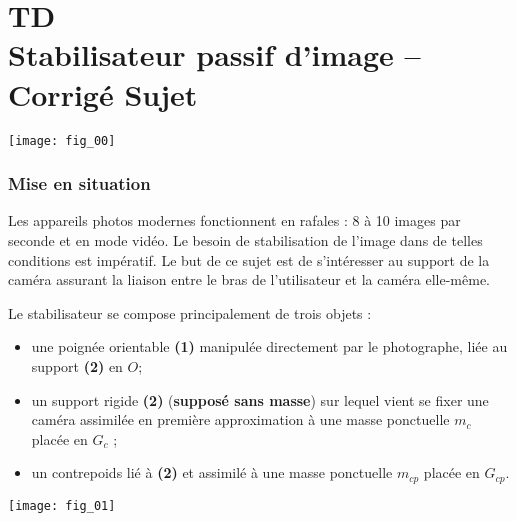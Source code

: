 \chapter*{TD  \\ 
Stabilisateur passif d'image -- \ifprof Corrigé \else Sujet \fi}

\iflivret {} \else
\ifprof  {} \else \fi
\fi

\setcounter{question}{0}
\begin{marginfigure}[4cm]
\centering
\texttt{[image: fig\_00]}
\end{marginfigure}




\subsection*{Mise en situation}
 \ifprof
 \else

Les appareils photos modernes fonctionnent en rafales : 8 à 10 images par seconde et en mode vidéo. Le besoin de
stabilisation de l’image dans de telles conditions est impératif. Le but de ce sujet est de s’intéresser au support de la caméra assurant la liaison entre le bras de l'utilisateur et la caméra elle-même.

Le stabilisateur se compose principalement de trois objets :
\begin{itemize}
\item une poignée orientable \textbf{(1)} manipulée directement par le photographe, liée au support \textbf{(2)} en $O$;
\item un support rigide \textbf{(2)} (\textbf{supposé sans masse}) sur lequel vient se fixer une caméra assimilée en première approximation à une masse ponctuelle $m_c$ placée en $G_c$ ;
\item un contrepoids lié à \textbf{(2)} et assimilé à une masse ponctuelle $m_{cp}$ placée en $G_{cp}$.
\end{itemize}

\begin{center}
\texttt{[image: fig\_01]}
\end{center}

